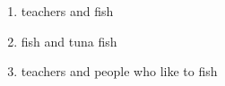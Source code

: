 \documentclass[12pt]{article}
\begin{document}
\begin{enumerate}
	\item teachers and fish
	\vskip 80pt
	\item fish and tuna fish
	\vskip 80pt
	\item teachers and people who like to fish
	\vskip 80pt
\end{enumerate}









\end{document}
